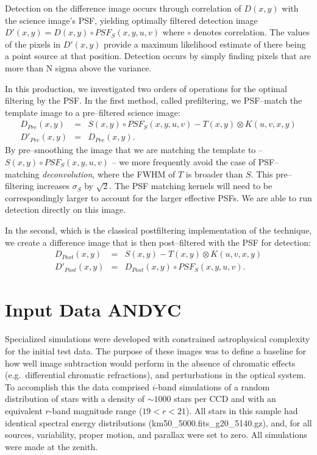\documentclass[prd, nofootinbib, floatfix, 11pt,tightenlines,times]{article}
\begin{document}
Detection on the difference image occurs through correlation of
$D(x,y)$ with the science image's PSF, yielding optimally filtered
detection image $D'(x,y) = D(x,y) \circ PSF_S(x,y,u,v)$ where $\circ$
denotes correlation.  The values of the pixels in $D'(x,y)$ provide a
maximum likelihood estimate of there being a point source at that
position.  Detection occurs by simply finding pixels that are more
than N sigma above the variance.  

In this production, we investigated two orders of operations for the
optimal filtering by the PSF.  In the first method, called
prefiltering, we PSF--match the template image to a pre--filtered
science image:
\begin{eqnarray}
D_{Pre}(x,y) & = & S(x,y) \circ PSF_S(x,y,u,v) - T(x,y) \otimes K(u,v,x,y) \nonumber \\ 
D'_{Pre}(x,y) & = & D_{Pre}(x,y). \nonumber 
\end{eqnarray}
By pre--smoothing the image that we are matching the template to --
$S(x,y) \circ PSF_S(x,y,u,v)$ -- we more frequently avoid the case of
PSF--matching {\it deconvolution}, where the FWHM of $T$ is broader
than $S$.  This pre--filtering increases $\sigma_S$ by $\sqrt{2}$.
The PSF matching kernels will need to be correspondingly larger to
account for the larger effective PSFs.  We are able to run detection
directly on this image.

In the second, which is the classical postfiltering implementation of
the technique, we create a difference image that is then
post--filtered with the PSF for detection:
\begin{eqnarray}
D_{Post}(x,y) & = & S(x,y) - T(x,y) \otimes K(u,v,x,y) \nonumber \\ 
D'_{Post}(x,y) & = & D_{Post}(x,y) \circ PSF_S(x,y,u,v).  \nonumber 
\end{eqnarray}


\section{Input Data {\bf ANDYC}}

Specialized simulations were developed with constrained astrophysical
complexity for the initial test data. The purpose of these images was
to define a baseline for how well image subtraction would perform in
the absence of chromatic effects (e.g.\ differential chromatic
refractions), and perturbations in the optical system. To accomplish
this the data comprised $i$-band simulations of a random distribution
of stars with a density of $\sim 1000$ stars per CCD and with an
equivalent $r$-band magnitude range ($19<r<21$). All stars in this
sample had identical spectral energy distributions
(km50\_5000.fits\_g20\_5140.gz), and, for all sources, variability,
proper motion, and parallax were set to zero. All simulations were
made at the zenith.
\end{document}
